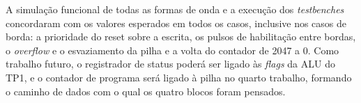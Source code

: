 A simulação funcional de todas as formas de onda e a execução dos \textit{testbenches} concordaram com os valores esperados em todos os casos, inclusive nos casos de borda: a prioridade do reset sobre a escrita, os pulsos de habilitação entre bordas, o \textit{overflow} e o esvaziamento da pilha e a volta do contador de 2047 a 0. Como trabalho futuro, o registrador de status poderá ser ligado às \textit{flags} da ALU do TP1, e o contador de programa será ligado à pilha no quarto trabalho, formando o caminho de dados com o qual os quatro blocos foram pensados.

